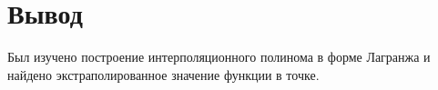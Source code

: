 \documentclass[../main.tex]{subfiles}
\begin{document}
\section{Вывод}

Был изучено построение интерполяционного полинома в форме Лагранжа и найдено экстраполированное значение функции в точке.
\end{document}
